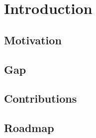 \section{Introduction}
\label{sec:intro}


\subsection{Motivation}

\subsection{Gap}

\subsection{Contributions}

\subsection{Roadmap}
